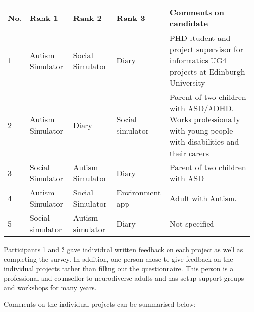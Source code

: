 \documentclass[11pt]{report}
\begin{document}
\begin{table}[H]
    \begin{tabular}{| p{2cm} | p{3cm} | p{3cm}| p{3cm} | p{4cm} |}
    \hline
    No. & Rank 1 & Rank 2 & Rank 3 & Comments on candidate \\ \hline
    1 & Autism Simulator & Social Simulator & Diary & PHD student and project supervisor for informatics UG4 projects at Edinburgh University\\ \hline
    2 & Autism Simulator & Diary & Social simulator & Parent of two children with ASD/ADHD. Works professionally with young people with disabilities and their carers\\ \hline
    3 & Social Simulator & Autism Simulator & Diary & Parent of two children with ASD\\ \hline
    4 & Autism Simulator & Social Simulator & Environment app & Adult with Autism. \\ \hline
    5 & Social simulator & Autism simulator & Diary & Not specified \\ \hline
    \end{tabular}
\end{table}

Participants 1 and 2 gave individual written feedback on each project as well as completing the survey. In addition, one person chose to give feedback on the individual projects rather than filling out the questionnaire. This person is a professional and counsellor to neurodiverse adults and has setup support groups and workshops for many years. 

Comments on the individual projects can be summarised below:
\end{document}
